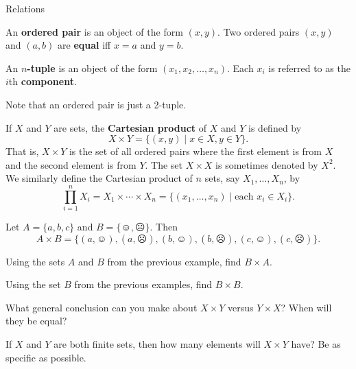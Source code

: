 \begin{section}{Relations}

\begin{definition}
An \textbf{ordered pair} is an object of the form $(x,y)$. Two ordered pairs $(x,y)$ and $(a,b)$ are \textbf{equal} iff $x=a$ and $y=b$. 
\end{definition}

\begin{definition}
An \textbf{$n$-tuple} is an object of the form $(x_1, x_2,\ldots,x_n)$.  Each $x_i$ is referred to as the $i$th \textbf{component}.
\end{definition}

Note that an ordered pair is just a 2-tuple.

\begin{definition}
If $X$ and $Y$ are sets, the \textbf{Cartesian product} of $X$ and $Y$ is defined by
\[
X\times Y=\{(x,y)\mid x\in X, y\in Y\}.
\]
That is, $X\times Y$ is the set of all ordered pairs where the first element is from $X$ and the second element is from $Y$.  The set $X\times X$ is sometimes denoted by $X^2$.  We similarly define the Cartesian product of $n$ sets, say $X_1, \ldots, X_n$, by
\[
\prod_{i=1}^{n} X_i=X_1\times \cdots \times X_n=\{(x_1,\ldots,x_n)\mid \mbox{each } x_i\in X_i\}.
\]
\end{definition}

\begin{example}
Let $A=\{a,b,c\}$ and $B=\{\smiley,\frownie\}$.  Then 
\[
A\times B=\{(a,\smiley), (a,\frownie),(b,\smiley),(b,\frownie), (c,\smiley),(c,\frownie)\}.
\]
\end{example}

\begin{exercise}
Using the sets $A$ and $B$ from the previous example, find $B\times A$.  
\end{exercise}

\begin{exercise}
Using the set $B$ from the previous examples, find $B\times B$.  
\end{exercise}

\begin{exercise}
What general conclusion can you make about $X\times Y$ versus $Y\times X$?  When will they be equal?
\end{exercise}

\begin{exercise}
If $X$ and $Y$ are both finite sets, then how many elements will $X\times Y$ have?  Be as specific as possible.
\end{exercise}


\end{section}
